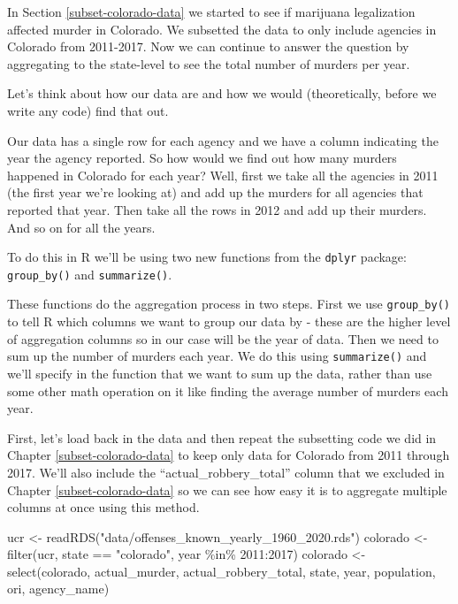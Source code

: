 \documentclass[
]{krantz}
\makeatletter
\newenvironment{Shaded}{\begin{snugshade}}{\end{snugshade}}
\newcommand{\DecValTok}[1]{\textcolor[rgb]{0.06,0.06,0.06}{#1}}
\newcommand{\FunctionTok}[1]{\textcolor[rgb]{0,0,0}{#1}}
\newcommand{\NormalTok}[1]{#1}
\newcommand{\OtherTok}[1]{\textcolor[rgb]{0.37,0.37,0.37}{#1}}
\newcommand{\SpecialCharTok}[1]{\textcolor[rgb]{0,0,0}{#1}}
\newcommand{\StringTok}[1]{\textcolor[rgb]{0.5,0.5,0.5}{#1}}
\newenvironment{kframe}{%
\medskip{}
\setlength{\fboxsep}{.8em}
 \def\at@end@of@kframe{}%
 \ifinner\ifhmode%
  \def\at@end@of@kframe{\end{minipage}}%
  \begin{minipage}{\columnwidth}%
 \fi\fi%
 \def\FrameCommand##1{\hskip\@totalleftmargin \hskip-\fboxsep
 \colorbox{shadecolor}{##1}\hskip-\fboxsep
     \hskip-\linewidth \hskip-\@totalleftmargin \hskip\columnwidth}%
 \MakeFramed {\advance\hsize-\width
   \@totalleftmargin\z@ \linewidth\hsize
   \@setminipage}}%
 {\par\unskip\endMakeFramed%
 \at@end@of@kframe}
\renewenvironment{Shaded}{\begin{kframe}}{\end{kframe}}
\makeatother
\begin{document}
In Section \ref{subset-colorado-data} we started to see if marijuana legalization affected murder in Colorado. We subsetted the data to only include agencies in Colorado from 2011-2017. Now we can continue to answer the question by aggregating to the state-level to see the total number of murders per year.

Let's think about how our data are and how we would (theoretically, before we write any code) find that out.

Our data has a single row for each agency and we have a column indicating the year the agency reported. So how would we find out how many murders happened in Colorado for each year? Well, first we take all the agencies in 2011 (the first year we're looking at) and add up the murders for all agencies that reported that year. Then take all the rows in 2012 and add up their murders. And so on for all the years.

To do this in R we'll be using two new functions from the \texttt{dplyr} package: \texttt{group\_by()} and \texttt{summarize()}.

These functions do the aggregation process in two steps. First we use \texttt{group\_by()} to tell R which columns we want to group our data by - these are the higher level of aggregation columns so in our case will be the year of data. Then we need to sum up the number of murders each year. We do this using \texttt{summarize()} and we'll specify in the function that we want to sum up the data, rather than use some other math operation on it like finding the average number of murders each year.

First, let's load back in the data and then repeat the subsetting code we did in Chapter \ref{subset-colorado-data} to keep only data for Colorado from 2011 through 2017. We'll also include the ``actual\_robbery\_total'' column that we excluded in Chapter \ref{subset-colorado-data} so we can see how easy it is to aggregate multiple columns at once using this method.

\begin{Shaded}
\begin{Highlighting}[]
\NormalTok{ucr }\OtherTok{\textless{}{-}} \FunctionTok{readRDS}\NormalTok{(}\StringTok{"data/offenses\_known\_yearly\_1960\_2020.rds"}\NormalTok{)}
\NormalTok{colorado }\OtherTok{\textless{}{-}} \FunctionTok{filter}\NormalTok{(ucr, state }\SpecialCharTok{==} \StringTok{"colorado"}\NormalTok{, }
\NormalTok{                   year }\SpecialCharTok{\%in\%} \DecValTok{2011}\SpecialCharTok{:}\DecValTok{2017}\NormalTok{)}
\NormalTok{colorado }\OtherTok{\textless{}{-}} \FunctionTok{select}\NormalTok{(colorado, actual\_murder, actual\_robbery\_total, }
\NormalTok{                   state, year, population, ori, agency\_name)}
\end{Highlighting}
\end{Shaded}
\end{document}
